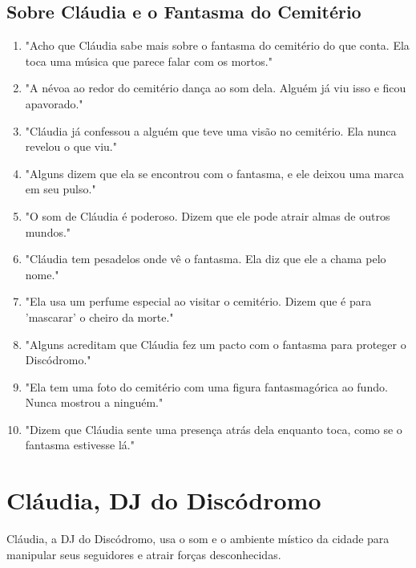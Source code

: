 \subsection*{Sobre Cláudia e o Fantasma do Cemitério}
\begin{enumerate}
    \item "Acho que Cláudia sabe mais sobre o fantasma do cemitério do que conta. Ela toca uma música que parece falar com os mortos."
    \item "A névoa ao redor do cemitério dança ao som dela. Alguém já viu isso e ficou apavorado."
    \item "Cláudia já confessou a alguém que teve uma visão no cemitério. Ela nunca revelou o que viu."
    \item "Alguns dizem que ela se encontrou com o fantasma, e ele deixou uma marca em seu pulso."
    \item "O som de Cláudia é poderoso. Dizem que ele pode atrair almas de outros mundos."
    \item "Cláudia tem pesadelos onde vê o fantasma. Ela diz que ele a chama pelo nome."
    \item "Ela usa um perfume especial ao visitar o cemitério. Dizem que é para 'mascarar' o cheiro da morte."
    \item "Alguns acreditam que Cláudia fez um pacto com o fantasma para proteger o Discódromo."
    \item "Ela tem uma foto do cemitério com uma figura fantasmagórica ao fundo. Nunca mostrou a ninguém."
    \item "Dizem que Cláudia sente uma presença atrás dela enquanto toca, como se o fantasma estivesse lá."
\end{enumerate}

\section{Cláudia, DJ do Discódromo}
Cláudia, a DJ do Discódromo, usa o som e o ambiente místico da cidade para manipular seus seguidores e atrair forças desconhecidas.

